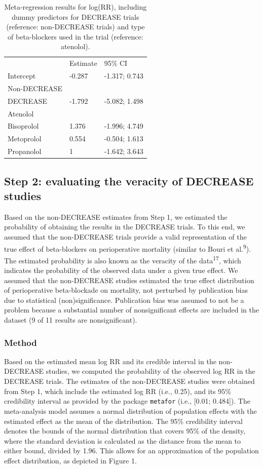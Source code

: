 \documentclass[]{article}
\begin{document}
\begin{longtable}[]{@{}lll@{}}
\caption{Meta-regression results for log(RR), including dummy predictors
for DECREASE trials (reference: non-DECREASE trials) and type of
beta-blockers used in the trial (reference: atenolol).}\tabularnewline
\toprule
& Estimate & 95\% CI\tabularnewline
Intercept & -0.287 & -1.317; 0.743\tabularnewline
Non-DECREASE & &\tabularnewline
DECREASE & -1.792 & -5.082; 1.498\tabularnewline
Atenolol & &\tabularnewline
Bisoprolol & 1.376 & -1.996; 4.749\tabularnewline
Metoprolol & 0.554 & -0.504; 1.613\tabularnewline
Propanolol & 1 & -1.642; 3.643\tabularnewline
\bottomrule
\end{longtable}

\subsection{Step 2: evaluating the veracity of DECREASE
studies}\label{step-2-evaluating-the-veracity-of-decrease-studies}

Based on the non-DECREASE estimates from Step 1, we estimated the
probability of obtaining the results in the DECREASE trials. To this
end, we assumed that the non-DECREASE trials provide a valid
representation of the true effect of beta-blockers on perioperative
mortality (similar to Bouri et al.\textsuperscript{9}). The estimated
probability is also known as the veracity of the
data\textsuperscript{17}, which indicates the probability of the
observed data under a given true effect. We assumed that the
non-DECREASE studies estimated the true effect distribution of
perioperative beta-blockade on mortality, not perturbed by publication
bias due to statistical (non)significance. Publication bias was assumed
to not be a problem because a substantial number of nonsignificant
effects are included in the dataset (9 of 11 results are
nonsignificant).

\subsubsection{Method}\label{method}

Based on the estimated mean log RR and its credible interval in the
non-DECREASE studies, we computed the probability of the observed log RR
in the DECREASE trials. The estimates of the non-DECREASE studies were
obtained from Step 1, which include the estimated log RR (i.e., 0.25),
and its 95\% credibility interval as provided by the package
\texttt{metafor} (i.e., {[}0.01; 0.484{]}). The meta-analysis model
assumes a normal distribution of population effects with the estimated
effect as the mean of the distribution. The 95\% credibility interval
denotes the bounds of the normal distribution that covers 95\% of the
density, where the standard deviation is calculated as the distance from
the mean to either bound, divided by 1.96. This allows for an
approximation of the population effect distribution, as depicted in
Figure 1.
\end{document}
